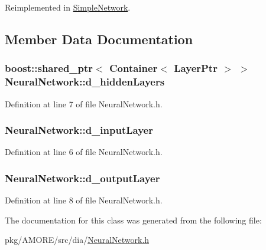 Reimplemented in \hyperlink{class_simple_network_adfbe36eff51ead5995f2ccc58fcee709}{SimpleNetwork}.



\subsection{Member Data Documentation}
\hypertarget{class_neural_network_ab030966dcd9ee3b7706923d2d5d6a0e7}{
\subsubsection[{d\_\-hiddenLayers}]{\setlength{\rightskip}{0pt plus 5cm}boost::shared\_\-ptr$<$ {\bf Container}$<$ {\bf LayerPtr} $>$ $>$ {\bf NeuralNetwork::d\_\-hiddenLayers}}}
\label{class_neural_network_ab030966dcd9ee3b7706923d2d5d6a0e7}


Definition at line 7 of file NeuralNetwork.h.

\hypertarget{class_neural_network_ada358911107a3a4cdccf0812d876393f}{
\subsubsection[{d\_\-inputLayer}]{ {\bf NeuralNetwork::d\_\-inputLayer}}}
\label{class_neural_network_ada358911107a3a4cdccf0812d876393f}


Definition at line 6 of file NeuralNetwork.h.

\hypertarget{class_neural_network_af61fb83fcaaf81c5fa0574f7d3bdc268}{
\subsubsection[{d\_\-outputLayer}]{ {\bf NeuralNetwork::d\_\-outputLayer}}}
\label{class_neural_network_af61fb83fcaaf81c5fa0574f7d3bdc268}


Definition at line 8 of file NeuralNetwork.h.



The documentation for this class was generated from the following file:\begin{DoxyCompactItemize}
\item 
pkg/AMORE/src/dia/\hyperlink{_neural_network_8h}{NeuralNetwork.h}\end{DoxyCompactItemize}
